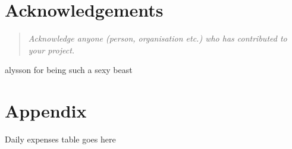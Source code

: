 \documentclass[12pt]{article}
\begin{document}
\section{Acknowledgements}
\label{sec:acknow}


\begin{quote} \textit{
Acknowledge anyone (person, organisation etc.) who has contributed to your project.
} \end{quote}

alysson for being such a sexy beast



\pagebreak


\section{Appendix}
\label{sec:appen}

Daily expenses table goes here

\pagebreak
 
\end{document}
